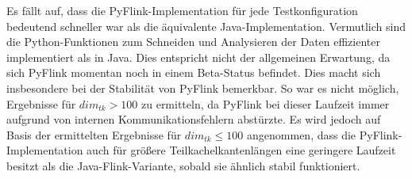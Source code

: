 Es fällt auf, dass die PyFlink-Implementation für jede Testkonfiguration bedeutend schneller war als die äquivalente Java-Implementation. Vermutlich sind die Python-Funktionen zum Schneiden und Analysieren der Daten effizienter implementiert als in Java. Dies entspricht nicht der allgemeinen Erwartung, da sich PyFlink momentan noch in einem Beta-Status befindet. Dies macht sich insbesondere bei der Stabilität von PyFlink bemerkbar. So war es nicht möglich, Ergebnisse für $dim_{tk} > 100$ zu ermitteln, da PyFlink bei dieser Laufzeit immer aufgrund von internen Kommunikationsfehlern abstürzte. Es wird jedoch auf Basis der ermittelten Ergebnisse für $dim_{tk} \leq 100$ angenommen, dass die PyFlink-Implementation auch für größere Teilkachelkantenlängen eine geringere Laufzeit besitzt als die Java-Flink-Variante, sobald sie ähnlich stabil funktioniert.

